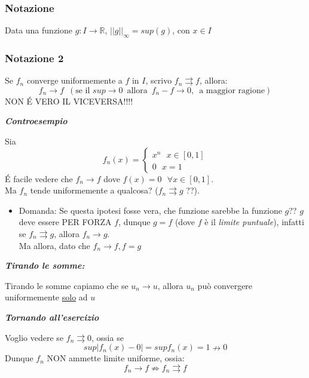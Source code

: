 \documentclass{article}
\theoremstyle{definition}
\newcommand{\R}{\mathbb{R}}
\begin{document}
\subsubsection{Notazione}
Data una funzione $g: I \to \R$, $||g||_\infty=sup(g)$, con $x \in I$
\subsubsection{Notazione 2}
Se $f_n$ converge uniformemente a $f$ in $I$, scrivo $f_n \rightrightarrows f $, allora:
\begin{equation}
    f_n \to f \,\,\, (\mbox{se il} \,\, sup \to 0\,\,\, \mbox{allora}\,\,\, f_n-f \to 0, \,\,\, \mbox{a maggior ragione})
\end{equation}
NON \'E VERO IL VICEVERSA!!!!
\begin{center}
    \textbf{\textit{Controesempio}}
\end{center}
Sia 
\begin{equation}
    f_n(x)=\begin{cases}
        x^n \,\,\,\, x \in \left[0,1\right] \\
        0 \,\,\,\, x=1
    \end{cases}
\end{equation}
\'E facile vedere che $f_n \to f$ dove $f(x)=0 \,\,\,\, \forall x \in \left[0,1\right]$.
\\
Ma $f_n$ tende uniformemente a qualcosa? ($f_n \rightrightarrows g$ ??).
\begin{itemize}
    \item Domanda: Se questa ipotesi fosse vera, che funzione sarebbe la funzione $g$?? $g$ deve essere PER FORZA $f$, dunque $g=f$ (dove $f$ è il \textit{limite puntuale}), infatti se $f_n \rightrightarrows g$, allora $f_n \to g$.
    \\
    Ma allora, dato che $f_n \to f, f=g$
\end{itemize}
\begin{center}
    \textbf{\textit{Tirando le somme:}}
\end{center}
Tirando le somme capiamo che se $u_n \to u$, allora $u_n$ può convergere uniformemente \underline{solo} ad $u$
\begin{center}
    \textbf{\textit{Tornando all'esercizio}}
\end{center}
Voglio vedere se $f_n \rightrightarrows 0$, ossia se 
\begin{equation}
    sup|f_n(x) - 0| =supf_n(x)= 1 \nrightarrow 0
\end{equation}
Dunque $f_n$ NON ammette limite uniforme, ossia:
\begin{equation}
    f_n \to f \nRightarrow f_n \rightrightarrows f
\end{equation}
\end{document}
